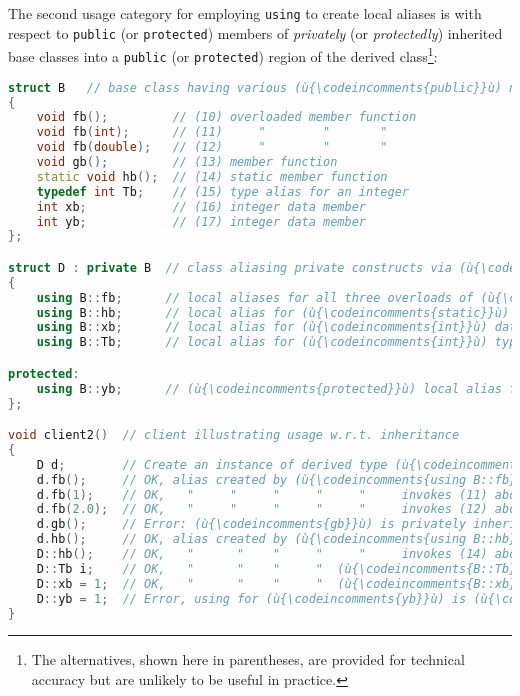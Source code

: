 \noindent The second usage category for employing \texttt{using} to create local
aliases is with respect to \texttt{public} (or \texttt{protected})
members of \emph{privately} (or \emph{protectedly}) inherited base
classes into a \texttt{public} (or \texttt{protected}) region of the
derived class{\cprotect\footnote{The alternatives, shown here in
parentheses, are provided for technical accuracy but are unlikely to
  be useful in practice.}}:

\begin{lstlisting}[language=C++]
struct B   // base class having various (ù{\codeincomments{public}}ù) named entities
{
    void fb();         // (10) overloaded member function
    void fb(int);      // (11)     "        "       "
    void fb(double);   // (12)     "        "       "
    void gb();         // (13) member function
    static void hb();  // (14) static member function
    typedef int Tb;    // (15) type alias for an integer
    int xb;            // (16) integer data member
    int yb;            // (17) integer data member
};

struct D : private B  // class aliasing private constructs via (ù{\codeincomments{using}}ù)
{
    using B::fb;      // local aliases for all three overloads of (ù{\codeincomments{fb}}ù)
    using B::hb;      // local alias for (ù{\codeincomments{static}}ù) member function (ù{\codeincomments{hb}}ù)
    using B::xb;      // local alias for (ù{\codeincomments{int}}ù) data member (ù{\codeincomments{xb}}ù)
    using B::Tb;      // local alias for (ù{\codeincomments{int}}ù) type alias

protected:
    using B::yb;      // (ù{\codeincomments{protected}}ù) local alias for (ù{\codeincomments{int}}ù) data member (ù{\codeincomments{yb}}ù)
};

void client2()  // client illustrating usage w.r.t. inheritance
{
    D d;        // Create an instance of derived type (ù{\codeincomments{D}}ù).
    d.fb();     // OK, alias created by (ù{\codeincomments{using B::fb}}ù)  invokes (10) above.
    d.fb(1);    // OK,   "     "     "     "     "     invokes (11) above.
    d.fb(2.0);  // OK,   "     "     "     "     "     invokes (12) above.
    d.gb();     // Error: (ù{\codeincomments{gb}}ù) is privately inherited without using declaration.
    d.hb();     // OK, alias created by (ù{\codeincomments{using B::hb}}ù)  invokes (14) above.
    D::hb();    // OK,   "      "    "     "     "     invokes (14) above.
    D::Tb i;    // OK,   "      "    "     "  (ù{\codeincomments{B::Tb}}ù)  aliases (15) above.
    D::xb = 1;  // OK,   "      "    "     "  (ù{\codeincomments{B::xb}}ù)  assigns (16) above.
    D::yb = 1;  // Error, using for (ù{\codeincomments{yb}}ù) is (ù{\codeincomments{protected}}ù), not (ù{\codeincomments{public}}ù).
}
\end{lstlisting}

